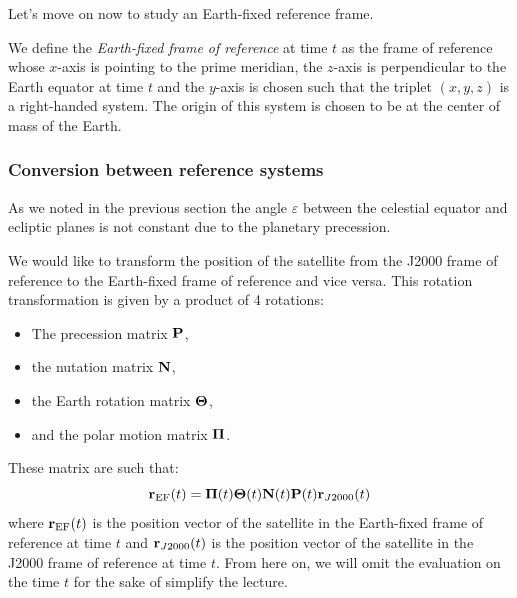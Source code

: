 \documentclass[../main.tex]{subfiles}
\begin{document}
Let's move on now to study an Earth-fixed reference frame.
\begin{definition}
  We define the \emph{Earth-fixed frame of reference} at time $t$ as the frame of reference whose $x$-axis is pointing to the prime meridian, the $z$-axis is perpendicular to the Earth equator at time $t$ and the $y$-axis is chosen such that the triplet $(x,y,z)$ is a right-handed system. The origin of this system is chosen to be at the center of mass of the Earth.
\end{definition}
\subsubsection{Conversion between reference systems}
As we noted in the previous section the angle $\varepsilon$ between the celestial equator and ecliptic planes is not constant due to the planetary precession.

We would like to transform the position of the satellite from the J2000 frame of reference to the Earth-fixed frame of reference and vice versa. This rotation transformation is given by a product of 4 rotations:
\begin{itemize}
  \item The precession matrix $\boldsymbol{\mathrm{P}}$,
  \item the nutation matrix $\boldsymbol{\mathrm{N}}$,
  \item the Earth rotation matrix $\boldsymbol{\mathrm{\Theta}}$,
  \item and the polar motion matrix $\boldsymbol{\mathrm{\Pi}}$.
\end{itemize}
These matrix are such that:
\begin{equation}
  \boldsymbol{\mathrm{r}}_\mathrm{EF}(t)=\boldsymbol{\mathrm{\Pi}}(t)\boldsymbol{\mathrm{\Theta}}(t)\boldsymbol{\mathrm{N}}(t)\boldsymbol{\mathrm{P}}(t)\boldsymbol{\mathrm{r}}_{J2000}(t)
\end{equation}
where $\boldsymbol{\mathrm{r}}_\mathrm{EF}(t)$ is the position vector of the satellite in the Earth-fixed frame of reference at time $t$ and $\boldsymbol{\mathrm{r}}_{J2000}(t)$ is the position vector of the satellite in the J2000 frame of reference at time $t$. From here on, we will omit the evaluation on the time $t$ for the sake of simplify the lecture.
\end{document}
